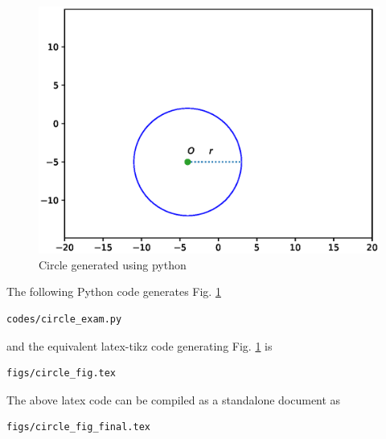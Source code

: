 \begin{enumerate}[label=\thesubsection.\arabic*.,ref=\thesubsection.\theenumi]
\begin{figure}[!ht]
\centering
\includegraphics[width=\columnwidth]{./figs/circle_examp/circle.eps}
\caption{Circle generated using python}
\label{fig:circle2_circle_examp}
\end{figure} 

\solution The  following Python code generates Fig. \ref{fig:circle2_circle_examp}

\begin{lstlisting}
codes/circle_exam.py
\end{lstlisting}

and the equivalent latex-tikz code generating Fig. \ref{fig:circle2_circle_examp} is 
\begin{lstlisting}
figs/circle_fig.tex
\end{lstlisting}
%
The above latex code can be compiled as a standalone document as
\begin{lstlisting}
figs/circle_fig_final.tex
\end{lstlisting}
\end{enumerate}


